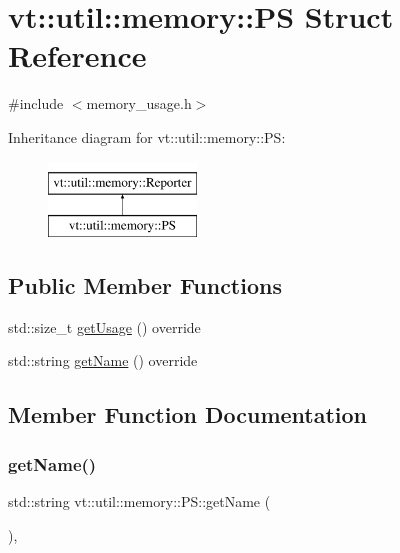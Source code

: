 \hypertarget{structvt_1_1util_1_1memory_1_1_p_s}{}\section{vt\+:\+:util\+:\+:memory\+:\+:PS Struct Reference}
\label{structvt_1_1util_1_1memory_1_1_p_s}


{\ttfamily \#include $<$memory\+\_\+usage.\+h$>$}

Inheritance diagram for vt\+:\+:util\+:\+:memory\+:\+:PS\+:\begin{figure}[H]
\begin{center}
\leavevmode
\includegraphics[height=2.000000cm]{structvt_1_1util_1_1memory_1_1_p_s}
\end{center}
\end{figure}
\subsection*{Public Member Functions}
\begin{DoxyCompactItemize}
\item 
std\+::size\+\_\+t \hyperlink{structvt_1_1util_1_1memory_1_1_p_s_a8637d08841cd23f361e83be9cc15e2b4}{get\+Usage} () override
\item 
std\+::string \hyperlink{structvt_1_1util_1_1memory_1_1_p_s_a011bb0261eefffa53110ba35243c4c8b}{get\+Name} () override
\end{DoxyCompactItemize}


\subsection{Member Function Documentation}
\mbox{\label{structvt_1_1util_1_1memory_1_1_p_s_a011bb0261eefffa53110ba35243c4c8b}} 
\subsubsection{\texorpdfstring{get\+Name()}{getName()}}
{\footnotesize\ttfamily std\+::string vt\+::util\+::memory\+::\+P\+S\+::get\+Name (\begin{DoxyParamCaption}{ }\end{DoxyParamCaption})\hspace{0.3cm}{\ttfamily [override]}, {\ttfamily [virtual]}}



